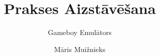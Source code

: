 \documentclass{beamer}
\title{Prakses Aizstāvēšana}
\subtitle{Gameboy Emulātors}
\author{Māris Muižnieks}
\begin{document}
\begin{frame}
	\maketitle
\end{frame}
\begin{frame}
	
\end{frame}
\end{document}
